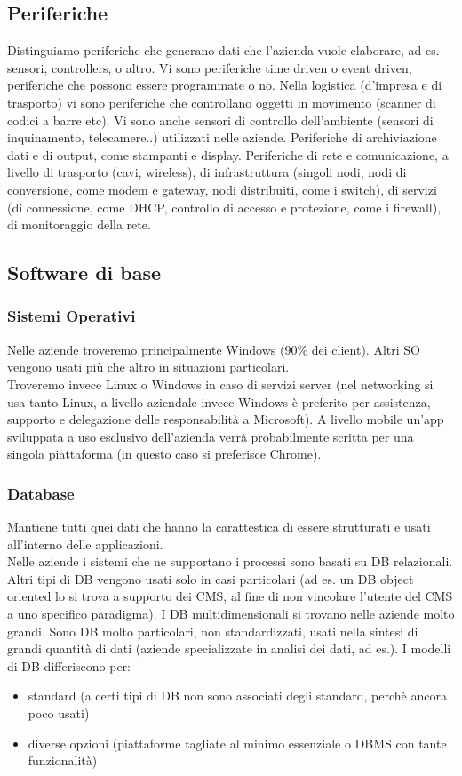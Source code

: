 \subsection{Periferiche}
Distinguiamo periferiche che generano dati che l'azienda vuole elaborare, ad es. sensori, controllers, o altro.
Vi sono periferiche time driven o event driven, periferiche che possono essere programmate o no.
Nella logistica (d'impresa e di trasporto) vi sono periferiche che controllano oggetti in movimento (scanner di codici a barre etc).
Vi sono anche sensori di controllo dell'ambiente (sensori di inquinamento, telecamere..) utilizzati nelle aziende.
Periferiche di archiviazione dati e di output, come stampanti e display.
Periferiche di rete e comunicazione, a livello di trasporto (cavi, wireless), di infrastruttura (singoli nodi, nodi di conversione, come modem e gateway, nodi distribuiti, come i switch), di servizi (di connessione, come DHCP, controllo di accesso e protezione, come i firewall), di monitoraggio della rete.

\subsection{Software di base}
\subsubsection{Sistemi Operativi}
Nelle aziende troveremo principalmente Windows (90\% dei client). Altri SO vengono usati
pi\`u che altro in situazioni particolari. \\
Troveremo invece Linux o Windows in caso di servizi server (nel networking si usa tanto Linux, a livello
aziendale invece Windows \`e preferito per assistenza, supporto e delegazione delle responsabilit\`a a Microsoft).
A livello mobile un'app sviluppata a uso esclusivo dell'azienda verr\`a probabilmente scritta
per una singola piattaforma (in questo caso si preferisce Chrome).
\subsubsection{Database}
\label{subs:Database}
Mantiene tutti quei dati che hanno la carattestica di essere strutturati e usati all'interno
delle applicazioni.\\
Nelle aziende i sistemi che ne supportano i processi sono basati su DB relazionali.
Altri tipi di DB vengono usati solo in casi particolari (ad es. un DB object oriented
lo si trova a supporto dei CMS, al fine di non vincolare l'utente del CMS a uno specifico paradigma).
I DB multidimensionali si trovano nelle aziende molto grandi. Sono DB molto particolari, non standardizzati,
usati nella sintesi di grandi quantit\`a di dati (aziende specializzate in analisi dei dati, ad es.).
I modelli di DB differiscono per:
\begin{itemize}
  \item standard (a certi tipi di  DB non sono associati degli standard, perch\`e ancora poco usati)
  \item diverse opzioni (piattaforme tagliate al minimo essenziale o DBMS con tante funzionalit\`a)
\end{itemize}
